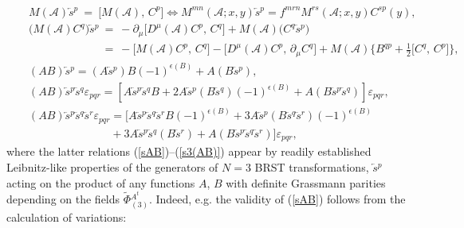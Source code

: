 \documentclass[10pt]{article}
\begin{document}
\begin{eqnarray}
&& \label{auxsaK} M(\mathcal{A}) \overleftarrow{s}{}^{p} \ =\  \big[M(\mathcal{A}),\, C^p\big]  \Longleftrightarrow M^{mn}(\mathcal{A};x,y) \overleftarrow{s}{}^{p} =  f^{mrn}M^{rs}(\mathcal{A};x,y)C^{sp}(y),\\
&& \label{auxsaK1} \big(M(\mathcal{A})C^{q}\big)\overleftarrow{s}{}^{p} \ =\  -  \partial_\mu \big[D^\mu(\mathcal{A}) C^p,\,C^q\big] + M(\mathcal{A})\big(C^q\overleftarrow{s}{}^{p}\big) \\
 && \phantom{\big(M(\mathcal{A})C^{q}\big)\overleftarrow{s}{}^{p}}\ = \ -\big[M(\mathcal{A}) C^p,\, C^q\big] -\big[D^\mu(\mathcal{A}) C^p,\, \partial_\mu C^q\big] + M(\mathcal{A})\Big\{B^{qp}+\frac{1}{2}\big[C^{q},\,C^{p} \big]\Big\}  , \nonumber\\
&&  \left(  AB\right)\overleftarrow{s}{}^{p}  =\left(  A\overleftarrow{s}{}^{p}\right)  B\left(  -1\right)^{\epsilon(B)}+A\left(  B\overleftarrow{s}{}^{p}\right),\label{sAB}\\
& &  \left(  AB\right) \overleftarrow{s}{}^{p}\overleftarrow{s}{}^{q}\varepsilon_{pqr} =\left[ A\overleftarrow{s}{}^{p}\overleftarrow{s}{}^{q}  B + 2  A\overleftarrow{s}{}^{p}
\left(  B\overleftarrow{s}{}^{q}\right)  \left(  -1\right) ^{\epsilon(B)}+A\left(
B\overleftarrow{s}{}^{p}\overleftarrow{s}{}^{q}\right) \right]\varepsilon_{pqr} , \label{s2(AB)} \\%
&& \left(  AB\right) \overleftarrow{s}{}^{p}\overleftarrow{s}{}^{q}\overleftarrow{s}{}^{r}\varepsilon_{pqr} =\Big[ A \overleftarrow{s}{}^{p}\overleftarrow{s}{}^{q}\overleftarrow{s}{}^{r} B(-1)^{\epsilon(B)}+3A\overleftarrow{s}{}^{p}
\left(  B\overleftarrow{s}{}^{q}\overleftarrow{s}{}^{r}\right)  \left(  -1\right) ^{\epsilon(B)} \label{s3(AB)}\\
&& \phantom{\left(  AB\right) \overleftarrow{s}{}^{p}\overleftarrow{s}{}^{q}\overleftarrow{s}{}^{r}\varepsilon_{pqr}} +3A\overleftarrow{s}{}^{p}\overleftarrow{s}{}^{q}
\left(  B\overleftarrow{s}{}^{r}\right) +A\left(
B\overleftarrow{s}{}^{p}\overleftarrow{s}{}^{q}\overleftarrow{s}{}^{r}\right)\Big]\varepsilon_{pqr} ,  \nonumber%
\end{eqnarray}
where the latter relations (\ref{sAB})--(\ref{s3(AB)}) appear by readily established Leibnitz-like properties of the generators  of
$N=3$ BRST transformations, $\overleftarrow{s}{}^{p}$ acting on the product of
any functions $A$, $B$ with definite Grassmann parities depending on the fields $\widetilde{\Phi}{}^{A^t}_{(3)}$. Indeed, e.g. the validity of (\ref{sAB}) follows from the calculation of variations:
\end{document}
